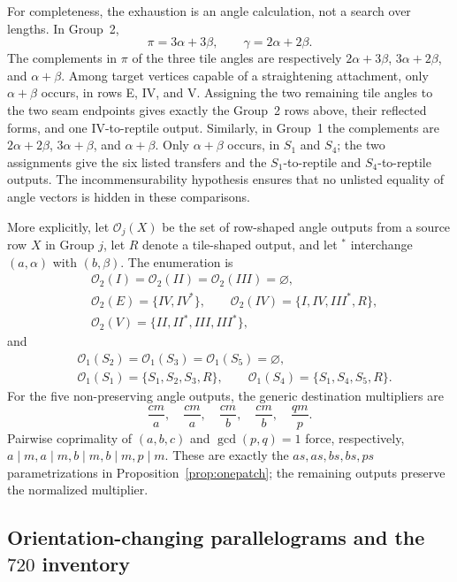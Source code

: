 \documentclass[11pt]{amsart}
\theoremstyle{definition}
\theoremstyle{remark}
\begin{document}
For completeness, the exhaustion is an angle calculation, not a search over
lengths.  In Group~2,
\[
 \pi=3\alpha+3\beta,\qquad
 \gamma=2\alpha+2\beta.
\]
The complements in $\pi$ of the three tile angles are respectively
$2\alpha+3\beta$, $3\alpha+2\beta$, and $\alpha+\beta$.
Among target vertices capable of a straightening attachment, only
$\alpha+\beta$ occurs, in rows E, IV, and V.  Assigning the two remaining
tile angles to the two seam endpoints gives exactly the Group~2 rows above,
their reflected forms, and one IV-to-reptile output.  Similarly, in Group~1
the complements are
$2\alpha+2\beta$, $3\alpha+\beta$, and $\alpha+\beta$.
Only $\alpha+\beta$ occurs, in $S_1$ and $S_4$; the two assignments give the
six listed transfers and the $S_1$-to-reptile and $S_4$-to-reptile outputs.
The incommensurability hypothesis ensures that no unlisted equality of angle
vectors is hidden in these comparisons.

More explicitly, let $\mathcal O_j(X)$ be the set of row-shaped angle outputs
from a source row $X$ in Group $j$, let $R$ denote a tile-shaped output, and
let ${}^\ast$ interchange $(a,\alpha)$ with $(b,\beta)$.  The enumeration is
\[
\begin{aligned}
&\mathcal O_2(I)=\mathcal O_2(II)=\mathcal O_2(III)=\varnothing,\\
&\mathcal O_2(E)=\{IV,IV^\ast\},\qquad
 \mathcal O_2(IV)=\{I,IV,III^\ast,R\},\\
&\mathcal O_2(V)=\{II,II^\ast,III,III^\ast\},
\end{aligned}
\]
and
\[
\begin{aligned}
&\mathcal O_1(S_2)=\mathcal O_1(S_3)=\mathcal O_1(S_5)=\varnothing,\\
&\mathcal O_1(S_1)=\{S_1,S_2,S_3,R\},\qquad
 \mathcal O_1(S_4)=\{S_1,S_4,S_5,R\}.
\end{aligned}
\]
For the five non-preserving angle outputs, the generic destination
multipliers are
\[
             \frac{cm}{a},\quad\frac{cm}{a},\quad\frac{cm}{b},
             \quad\frac{cm}{b},\quad\frac{qm}{p}.
\]
Pairwise coprimality of $(a,b,c)$ and $\gcd(p,q)=1$ force, respectively,
$a\mid m,a\mid m,b\mid m,b\mid m,p\mid m$.  These are exactly the
$as,as,bs,bs,ps$ parametrizations in
Proposition~\ref{prop:onepatch}; the remaining outputs preserve the
normalized multiplier.

\subsection{Orientation-changing parallelograms and the
\texorpdfstring{$720$}{720} inventory}
\end{document}
